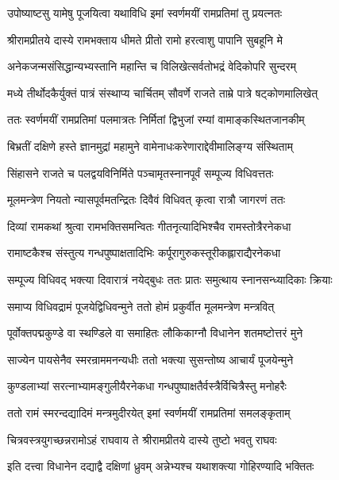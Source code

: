 \twolineshloka
{उपोष्याष्टसु यामेषु पूजयित्वा यथाविधि}
{इमां स्वर्णमयीं रामप्रतिमां तु प्रयत्नतः}%

\twolineshloka
{श्रीरामप्रीतये दास्ये रामभक्ताय धीमते}
{प्रीतो रामो हरत्वाशु पापानि सुबहूनि मे}%

\twolineshloka
{अनेकजन्मसंसिद्धान्यभ्यस्तानि महान्ति च}
{विलिखेत्सर्वतोभद्रं वेदिकोपरि सुन्दरम्}%

\twolineshloka
{मध्ये तीर्थोदकैर्युक्तं पात्रं संस्थाप्य चार्चितम्}
{सौवर्णे राजते ताम्रे पात्रे षट्कोणमालिखेत्}%

\twolineshloka
{ततः स्वर्णमयीं रामप्रतिमां पलमात्रतः}
{निर्मितां द्विभुजां रम्यां वामाङ्कस्थितजानकीम्}%

\twolineshloka
{बिभ्रतीं दक्षिणे हस्ते ज्ञानमुद्रां महामुने}
{वामेनाधःकरेणाराद्देवीमालिङ्ग्य संस्थिताम्}%

\twolineshloka
{सिंहासने राजते च पलद्वयविनिर्मिते}
{पञ्चामृतस्नानपूर्वं सम्पूज्य विधिवत्ततः}%

\twolineshloka
{मूलमन्त्रेण नियतो न्यासपूर्वमतन्द्रितः}
{दिवैवं विधिवत् कृत्वा रात्रौ जागरणं ततः}%

\twolineshloka
{दिव्यां रामकथां श्रुत्वा रामभक्तिसमन्वितः}
{गीतनृत्यादिभिश्चैव रामस्तोत्रैरनेकधा}%

\twolineshloka
{रामाष्टकैश्च संस्तुत्य गन्धपुष्पाक्षतादिभिः}
{कर्पूरागुरुकस्तूरीकह्लाराद्यैरनेकधा}%

\twolineshloka
{सम्पूज्य विधिवद् भक्त्या दिवारात्रं नयेद्बुधः}
{ततः प्रातः समुत्थाय स्नानसन्ध्यादिकाः क्रियाः}%

\twolineshloka
{समाप्य विधिवद्रामं पूजयेद्विधिवन्मुने}
{ततो होमं प्रकुर्वीत मूलमन्त्रेण मन्त्रवित्}%

\twolineshloka
{पूर्वोक्तपद्मकुण्डे वा स्थण्डिले वा समाहितः}
{लौकिकाग्नौ विधानेन शतमष्टोत्तरं मुने}%

\twolineshloka
{साज्येन पायसेनैव स्मरन्राममनन्यधीः}
{ततो भक्त्या सुसन्तोष्य आचार्यं पूजयेन्मुने}%

\twolineshloka
{कुण्डलाभ्यां सरत्नाभ्यामङ्गुलीयैरनेकधा}
{गन्धपुष्पाक्षतैर्वस्त्रैर्विचित्रैस्तु मनोहरैः}%

\twolineshloka
{ततो रामं स्मरन्दद्यादिमं मन्त्रमुदीरयेत्}
{इमां स्वर्णमयीं रामप्रतिमां समलङ्कृताम्}%

\twolineshloka
{चित्रवस्त्रयुगच्छन्नरामोऽहं राघवाय ते}
{श्रीरामप्रीतये दास्ये तुष्टो भवतु राघवः}%

\twolineshloka
{इति दत्त्वा विधानेन दद्याद्वै दक्षिणां ध्रुवम्}
{अन्नेभ्यश्च यथाशक्त्या गोहिरण्यादि भक्तितः}%

